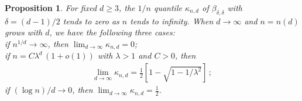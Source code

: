 \documentclass{article}
\def\ml{\lambda}
\newcommand{\be}{\begin{eqnarray}}
\newcommand{\ee}{\end{eqnarray}}
\newtheorem{proposition}{Proposition}[section]
\begin{document}
\begin{proposition} \label{th:kappa_n}
For fixed $d\geq 3$, the $1/n$ quantile $\kappa_{n,d}$ of  $\beta_{\delta,\delta}$ with $\delta=(d-1)/2$ tends to zero as $n$ tends to infinity. When $d \to \infty$ and $n=n(d)$ grows with $d$, we have the following three cases:\\
 if $n^{1/d}\to\infty$, then $\lim_{d\to\infty} \kappa_{n,d} = 0$;\\
 if $n=C\ml^d\,(1+o(1))$ with $\ml>1$ and $C>0$, then
\be \label{asymptotic-kappa} \lim_{d\to\infty} \kappa_{n,d} = \frac12 \left[1-\sqrt{1-1/\ml^2}\right]\, ;
\ee
{} %
if $(\log n)/d \to 0$, then $\lim_{d\to\infty} \kappa_{n,d} = \frac12$.
\end{proposition}
\end{document}
